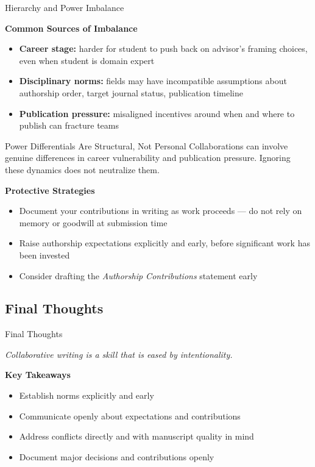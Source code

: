 \documentclass{beamer}
\begin{document}
\begin{frame}{Hierarchy and Power Imbalance}

  \footnotesize
  \textbf{Common Sources of Imbalance}
  \begin{itemize}
    \item \textbf{Career stage:} harder for student to
      push back on advisor's framing choices, even when student is domain expert
    \item \textbf{Disciplinary norms:} fields may have incompatible assumptions about authorship
      order, target journal status, publication timeline
    \item \textbf{Publication pressure:} misaligned incentives
      around when and where to publish can fracture teams
  \end{itemize}

  \begin{block}{Power Differentials Are Structural, Not Personal}
  Collaborations can involve genuine differences in career vulnerability and publication pressure. 
  Ignoring these dynamics does not neutralize them.
  \end{block}

  \textbf{Protective Strategies}
  \begin{itemize}
    \item Document your contributions in writing as work proceeds ---
      do not rely on memory or goodwill at submission time
    \item Raise authorship expectations explicitly and early,
      before significant work has been invested
    \item Consider drafting the \emph{Authorship Contributions} statement early
  \end{itemize}

\end{frame}


\subsection{Final Thoughts}
\begin{frame}{Final Thoughts}

  \begin{center}
    \emph{Collaborative writing is a skill that is eased by intentionality.}
  \end{center}

  \vspace{2em}
  \textbf{Key Takeaways}
  \begin{itemize}
    \item Establish norms explicitly and early
    \item Communicate openly about expectations and contributions
    \item Address conflicts directly and with manuscript quality in mind
    \item Document major decisions and contributions openly
  \end{itemize}
\end{frame}
\end{document}
